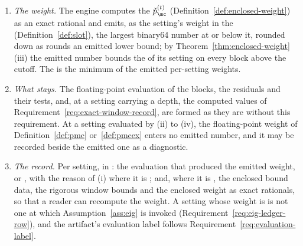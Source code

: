 \begin{requirement}
\begin{enumerate}[label=(\roman*),leftmargin=2.4em]
  forms an upper bound $u$ on $\lmax(B^{(t)})$, lower bounds $\ell_k$ on
  $\lmin(B^{(t)}_k)$, a lower bound $g$ on $\gamma^{(t)}$, upper bounds $b_k$
  on $\beta^{(t)}_k$ and lower bounds $\lambda_n$ on
  $\lmin(\blk{M}{\eqn}_{\mc|t})$. Its  are
  \eqref{eq:enclosed-construction} of Theorem~\ref{thm:enclosed-weight}\,(i),
  each of the four intersected with $[0,1]$, and its
   are $\max\{0,\lambda_n\}$. The output of a
  floating-point eigensolver may enter only as the basis $V$ of
  , read as the exact rational
  matrix it is; a basis for which the engine forms no rational $\theta<1$
  satisfying the hypothesis of that lemma is replaced by the identity, which
  admits $\theta=0$. No computed eigenvalue is used as a bound, and
  $\varepsilon_{\mathrm{eig}}$ is not subtracted.
\item \emph{The weight.} The engine computes the 
  $\check p^{(t)}_{\mc}$ (Definition~\ref{def:enclosed-weight}) as an exact
  rational and emits, as the setting's weight in the
   
  (Definition~\ref{def:slot}), the largest binary64 number at or below it,
  rounded down as  rounds an emitted
  lower bound; by Theorem~\ref{thm:enclosed-weight}\,(iii) the emitted number
  bounds the  of its setting on every block above the
  cutoff. The  is the minimum of the emitted per-setting
  weights.
\item \emph{What stays.} The floating-point evaluation of the blocks, the
  residuals and their tests, and, at a setting carrying a depth, the computed
  values of Requirement~\ref{req:exact-window-record}, are formed as they are
  without this requirement. At a setting evaluated by (ii) to (iv), the
  floating-point weight of Definition~\ref{def:pmc} or~\ref{def:pmcex} enters
  no emitted number, and it may be recorded beside the emitted one as a
  diagnostic.
\item \emph{The record.} Per setting, in : the
  evaluation that produced the emitted weight,  or
  , with the reason of (i) where it is
  ; and, where it is , the enclosed
  bound data, the rigorous window bounds and the enclosed weight as exact
  rationals, so that a reader can recompute the weight. A setting whose weight
  is  is not one at which Assumption~\ref{ass:eig} is invoked
  (Requirement~\ref{req:eig-ledger-row}), and the artifact's evaluation label
  follows Requirement~\ref{req:evaluation-label}.
\end{enumerate}
\end{requirement}
